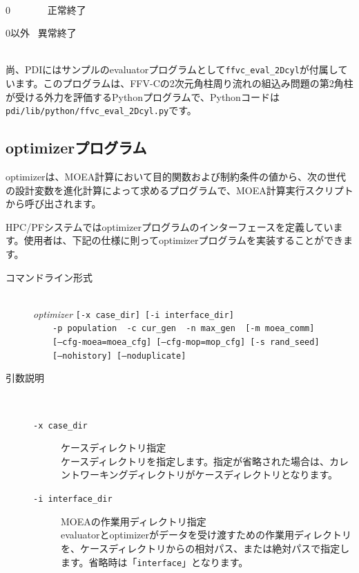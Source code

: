\documentclass[a4paper,11pt]{jarticle}
\begin{document}
{\begin{description}
\begin{description}
\end{description}


\item[戻り値(終了ステータス)] {\ }\\
0 \ \ \ \ \ \ \ 正常終了

0以外 \ 異常終了
\end{description}
 {\ }\\

尚、PDIにはサンプルのevaluatorプログラムとして{\tt ffvc\_eval\_2Dcyl}が付属しています。このプログラムは、FFV-Cの2次元角柱周り流れの組込み問題の第2角柱が受ける外力を評価するPythonプログラムで、Pythonコードは{\tt pdi/lib/python/ffvc\_eval\_2Dcyl.py}です。


\newpage
\subsection{optimizerプログラム}

optimizerは、MOEA計算において目的関数および制約条件の値から、次の世代の設計変数を進化計算によって求めるプログラムで、MOEA計算実行スクリプトから呼び出されます。

HPC/PFシステムではoptimizerプログラムのインターフェースを定義しています。使用者は、下記の仕様に則ってoptimizerプログラムを実装することができます。

\begin{description}
\item[コマンドライン形式] {\ }\\
\textit{optimizer} {\tt [-x case\_dir] [-i interface\_dir]}\\
\ \ \ \ {\tt -p population \ -c cur\_gen \ -n max\_gen \ [-m moea\_comm]}\\
\ \ \ \ {\tt [--cfg-moea=moea\_cfg] [--cfg-mop=mop\_cfg] [-s rand\_seed]}\\
\ \ \ \ {\tt [--nohistory] [--noduplicate]}


\item[引数説明] {\ }\par
\begin{description}
\item[{\tt -x  case\_dir}] ケースディレクトリ指定\\
ケースディレクトリを指定します。指定が省略された場合は、カレントワーキングディレクトリがケースディレクトリとなります。\\

\item[{\tt -i  interface\_dir}] MOEAの作業用ディレクトリ指定\\
evaluatorとoptimizerがデータを受け渡すための作業用ディレクトリを、ケースディレクトリからの相対パス、または絶対パスで指定します。省略時は「{\tt interface}」となります。


\end{description}
\end{description}}
\end{document}

